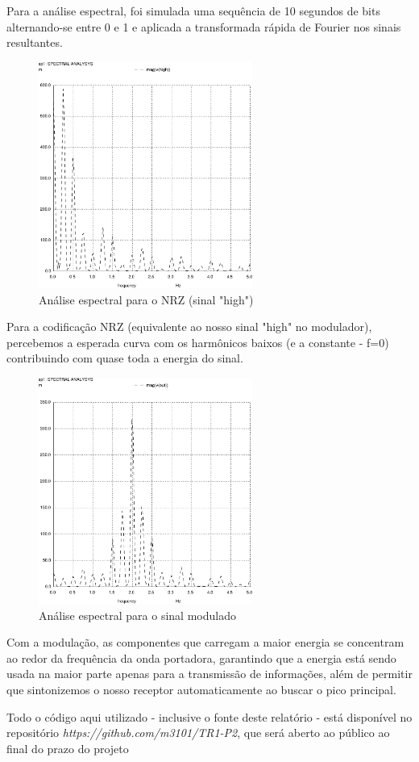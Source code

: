 \documentclass[titlepage,twocolumn]{article}
\begin{document}
Para a análise espectral, foi simulada uma sequência de 10 segundos de bits alternando-se entre 0 e 1 e aplicada a transformada rápida de Fourier nos sinais resultantes.

\begin{figure}[H]
    \begin{center}
        \includegraphics[width=7cm]{imgs/fftsquare.pdf}
        \caption{Análise espectral para o NRZ (sinal "high")}
    \end{center}
\end{figure}

Para a codificação NRZ (equivalente ao nosso sinal "high" no modulador), percebemos a esperada curva com os harmônicos baixos (e a constante - f=0) contribuindo com quase toda a energia do sinal.

\begin{figure}[H]
    \begin{center}
        \includegraphics[width=7cm]{imgs/fftsig.pdf}
        \caption{Análise espectral para o sinal modulado}
    \end{center}
\end{figure}

Com a modulação, as componentes que carregam a maior energia se concentram ao redor da frequência da onda por\-ta\-do\-ra, garantindo que a energia está sendo usada na maior parte apenas para a transmissão de informações, além de permitir que sintonizemos o nosso receptor automaticamente ao buscar o pico principal.

\small
\begin{center}
    Todo o código aqui utilizado - inclusive o fonte deste relatório - está disponível no repositório \textit{https://github.com/m3101/TR1-P2}, que será aberto ao público ao final do prazo do projeto
\end{center}
\end{document}
